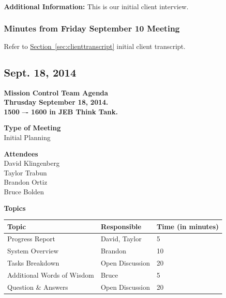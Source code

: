 \documentclass[pdftex,11pt]{article}
\begin{document}
\vspace*{2.5mm}
{ \large \bfseries \noindent Additional Information:}
This is our initial client interview.

\subsubsection[short]{Minutes from Friday September 10 Meeting}
Refer to \hyperref[sec:clienttranscript]{Section~\ref{sec:clienttranscript}} initial client  transcript.



\subsection{Sept. 18, 2014}
{ \huge \bfseries Mission Control Team Agenda \\[0.4cm] }
{ \huge \bfseries Thrusday September  18, 2014.\\1500 –-  1600  in JEB   Think  Tank. \\[0.4cm] }
\vspace*{2.5mm}

{ \large \bfseries \hspace*{2 mm} Type of Meeting\\}
\hspace*{12 mm} Initial Planning
\vspace*{1.5mm}

{ \large \bfseries \hspace*{2 mm} Attendees\\}
\hspace*{12mm} David Klingenberg\\
\hspace*{12mm} Taylor Trabun\\
\hspace*{12mm} Brandon Ortiz\\
\hspace*{12mm} Bruce Bolden\\
\vspace*{1.5mm}

{ \large \bfseries \noindent Topics}
\vspace*{2.5mm}

\begin{tabular}{| l | l | l |}
  \hline
  \bfseries Topic & \bfseries Responsible & \bfseries Time (in minutes) \\ \hline
  Progress Report  & David, Taylor &  5 \\ \hline
  System Overview & Brandon & 10 \\ \hline
  Tasks Breakdown & Open Discussion & 20 \\ \hline
  Additional Words of Wisdom & Bruce & 5 \\ \hline
  Question \&  Answers  & Open Discussion & 20 \\ 
  \hline
\end{tabular}
\end{document}
